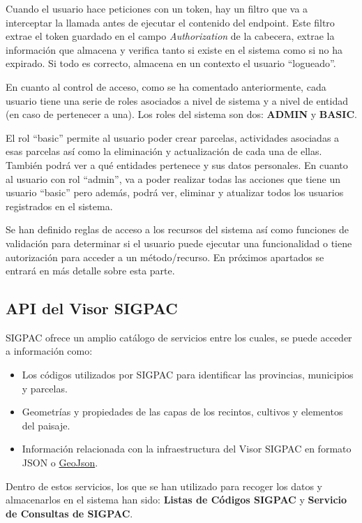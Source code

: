 Cuando el usuario hace peticiones con un token, hay un filtro que va a interceptar la llamada antes de ejecutar el contenido del endpoint. Este filtro
extrae el token guardado en el campo \textit{Authorization} de la cabecera, extrae la información que almacena y verifica tanto si existe en el sistema 
como si no ha expirado. Si todo es correcto, almacena en un contexto el usuario ``logueado''.

En cuanto al control de acceso, como se ha comentado anteriormente, cada usuario tiene una serie de roles asociados a nivel de sistema y a nivel de entidad
(en caso de pertenecer a una). Los roles del sistema son dos: \textbf{ADMIN} y \textbf{BASIC}. 

El rol ``basic'' permite al usuario poder crear parcelas, actividades asociadas a esas parcelas así como la eliminación y actualización de cada una de ellas. 
También podrá ver a qué entidades pertenece y sus datos personales. En cuanto al usuario con rol ``admin'', va a poder realizar todas las acciones que tiene 
un usuario ``basic'' pero además, podrá ver, eliminar y atualizar todos los usuarios registrados en el sistema.

Se han definido reglas de acceso a los recursos del sistema así como funciones de validación para determinar si el usuario puede ejecutar una funcionalidad
o tiene autorización para acceder a un método/recurso. En próximos apartados se entrará en más detalle sobre esta parte.

\subsection{API del Visor SIGPAC}

SIGPAC ofrece un amplio catálogo de servicios entre los cuales, se puede acceder a información como:

\begin{itemize}
    \item Los códigos utilizados por SIGPAC para identificar las provincias, municipios y parcelas.
    \item Geometrías y propiedades de las capas de los recintos, cultivos y elementos del paisaje.
    \item Información relacionada con la infraestructura del Visor SIGPAC en formato JSON o \hyperlink{geoJson}{GeoJson}.
\end{itemize} 

Dentro de estos servicios, los que se han utilizado para recoger los datos y almacenarlos en el sistema 
han sido: \textbf{Listas de Códigos SIGPAC} y \textbf{Servicio de Consultas de SIGPAC}.

